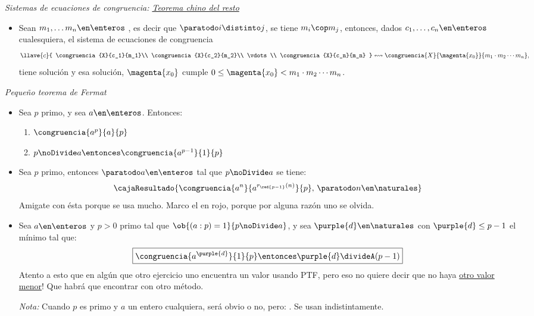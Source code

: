 \textit{Sistemas de ecuaciones de congruencia: \href{\superIdol}{Teorema chino del resto}}
\begin{itemize}
  \item
        Sean $m_1,\dots m_n \en \enteros$ \underline{}, es decir que $\paratodo i \distinto j$, se tiene $m_i \cop m_j$,
        entonces, dados $c_1,\dots, c_n \en \enteros$ cualesquiera, el sistema de ecuaciones de congruencia
        $$
          \llave{c}{
            \congruencia{X}{c_1}{m_1}\\
            \congruencia{X}{c_2}{m_2}\\
            \vdots\\
            \congruencia{X}{c_n}{m_n}
          } \leftrightsquigarrow
          \congruencia{X}{\magenta{x_0}}{m_1\cdot m_2 \cdots m_n},
        $$
        tiene solución y esa solución, $\magenta{x_0}$ cumple $0 \leq \magenta{x_0} < m_1\cdot m_2 \cdots m_n$.
\end{itemize}\bigskip

\hypertarget{teoria-5:PTF}{\textit{Pequeño teorema de Fermat}}
\begin{itemize}
  \item Sea $p$ primo, y sea $a \en \enteros$. Entonces:
        \begin{enumerate}[label=\arabic*)]
          \item $ \congruencia{a^p}{a}{p} $
          \item $ p \noDivide a \entonces \congruencia{a^{p-1}}{1}{p} $
        \end{enumerate}

  \item Sea $p$ primo, entonces $ \paratodo a \en \enteros$ tal que $ p \noDivide a$ se tiene:
        $$
          \cajaResultado{
            \congruencia{a^n}{a^{r_{\red{p-1}}(n)}}{p} ,\, \paratodo n \en \naturales
          }
        $$
        Amigate con ésta porque se usa mucho. Marco el  en rojo, porque por alguna razón uno se olvida.

  \item Sea $a \en \enteros$ y $p > 0$ primo tal que $\ob{(a:p) = 1}{p \noDivide a}$, y sea
        $\purple{d} \en \naturales$ con $\purple{d} \leq p - 1$
        el mínimo tal que:
        $$
          \boxed{
            \congruencia{a^{\purple{d}}}{1}{p} \entonces \purple{d} \divideA (p-1)
          }
        $$
        Atento a esto que en algún que otro ejercicio uno encuentra un valor usando PTF, pero eso no quiere
        decir que no haya \underline{otro valor menor}! Que habrá que encontrar con otro método.\par

        \textit{Nota:} Cuando $p$ es primo y $a$ un entero cualquiera, será obvio o no, pero: .
        Se usan indistintamente.
\end{itemize}
